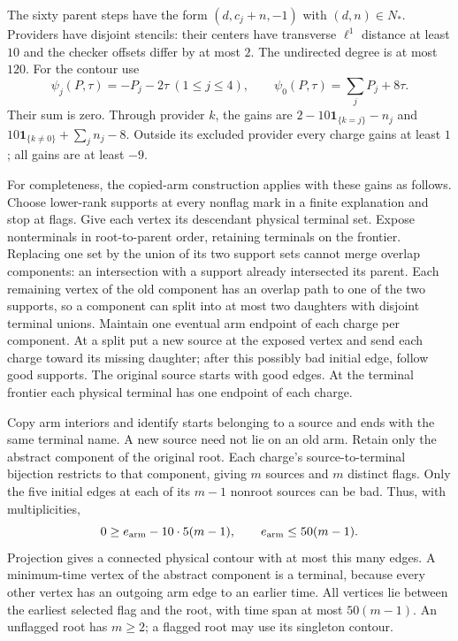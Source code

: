 The sixty parent steps have the form $(d,c_j+n,-1)$ with $(d,n)\in N_*$. Providers have disjoint stencils: their centers have transverse $\ell^1$ distance at least $10$ and the checker offsets differ by at most $2$. The undirected degree is at most $120$. For the contour use
\[
 \psi_j(P,\tau)=-P_j-2\tau\ (1\le j\le4),\qquad
 \psi_0(P,\tau)=\sum_jP_j+8\tau.
\]
Their sum is zero. Through provider $k$, the gains are $2-10\mathbf1_{\{k=j\}}-n_j$ and $10\mathbf1_{\{k\ne0\}}+\sum_jn_j-8$. Outside its excluded provider every charge gains at least $1$; all gains are at least $-9$.

For completeness, the copied-arm construction applies with these gains as follows. Choose lower-rank supports at every nonflag mark in a finite explanation and stop at flags. Give each vertex its descendant physical terminal set. Expose nonterminals in root-to-parent order, retaining terminals on the frontier. Replacing one set by the union of its two support sets cannot merge overlap components: an intersection with a support already intersected its parent. Each remaining vertex of the old component has an overlap path to one of the two supports, so a component can split into at most two daughters with disjoint terminal unions. Maintain one eventual arm endpoint of each charge per component. At a split put a new source at the exposed vertex and send each charge toward its missing daughter; after this possibly bad initial edge, follow good supports. The original source starts with good edges. At the terminal frontier each physical terminal has one endpoint of each charge.

Copy arm interiors and identify starts belonging to a source and ends with the same terminal name. A new source need not lie on an old arm. Retain only the abstract component of the original root. Each charge's source-to-terminal bijection restricts to that component, giving $m$ sources and $m$ distinct flags. Only the five initial edges at each of its $m-1$ nonroot sources can be bad. Thus, with multiplicities,
\[
 0\ge e_{\rm arm}-10\cdot5(m-1),\qquad e_{\rm arm}\le50(m-1).
\]
Projection gives a connected physical contour with at most this many edges. A minimum-time vertex of the abstract component is a terminal, because every other vertex has an outgoing arm edge to an earlier time. All vertices lie between the earliest selected flag and the root, with time span at most $50(m-1)$. An unflagged root has $m\ge2$; a flagged root may use its singleton contour.

